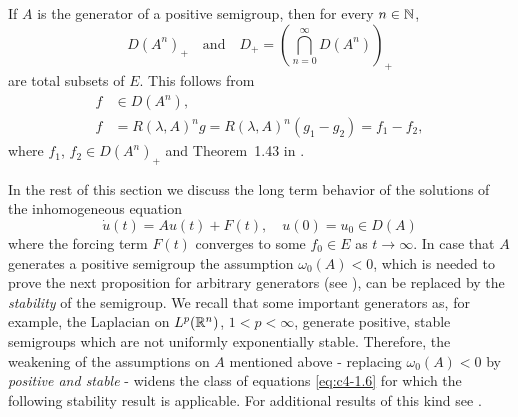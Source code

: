 \begin{remark}\label{rem:c4-1.10}
If $A$ is the generator of a positive semigroup, then for every $n \in \mathbb{N}$, 
\[
D(A^{n})_{+}
\quad \text{and} \quad 
D_{+} =  \left(\bigcap_{n=0}^{\infty} D(A^{n})\right)_{+}
\]
are total subsets of $E$.
This follows from 
\begin{align*}
    f &\in D(A^{n}), \\
    f &= R(\lambda,A)^{n}g = R(\lambda,A)^{n}(g_{1} - g_{2}) = f_{1} - f_{2},
\end{align*}
where $f_{1}$, $f_{2} \in D(A^{n})_{+}$ and Theorem~1.43 in \citet{davies:1980}.
\end{remark}
In the rest of this section we discuss the long term behavior of the solutions of the inhomogeneous equation
\begin{equation}\label{eq:c4-1.6}
\dot{u}(t) = Au(t) + F(t), \quad u(0) = u_{0} \in D(A)
\end{equation}
where the forcing term $F(t)$ converges to some $f_{0} \in E$ as $t \to \infty$.
In case that $A$ generates a positive semigroup the assumption \emph{$\omega_{0}(A) < 0$}, which is needed to prove the next proposition for arbitrary generators (see \citet[ Theorem~4.4.4]{pazy:1983}), can be replaced by the \emph{stability} of the semigroup.
We recall that some important generators as, for example, the Laplacian on $L^{p}(\mathbb{R}^{n})$, $1 < p < \infty$, generate positive, stable semigroups which are not uniformly exponentially stable.
Therefore, the weakening of the assumptions on $A$ mentioned above - \ie  replacing \emph{$\omega_{0}(A) < 0$} by \emph{positive and stable} - widens the class of equations \ref{eq:c4-1.6} for which the following stability result is applicable.
For additional results of this kind see \citet{neubrander:1985b}.

